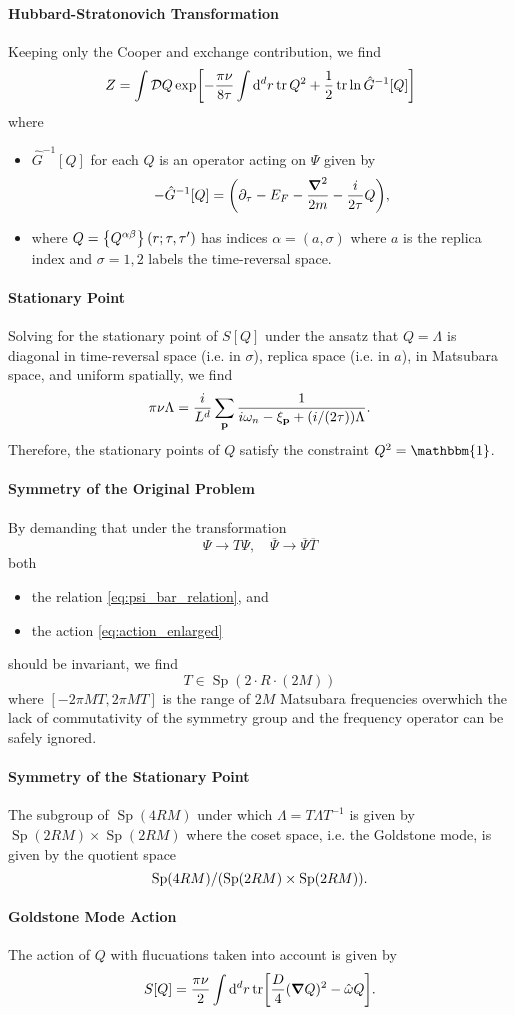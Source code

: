 \documentclass{article}
\begin{document}
\paragraph*{Hubbard-Stratonovich Transformation}
Keeping only the Cooper and exchange contribution, we find
\[ Z = \int \mathcal{D}{Q} \exp[-\frac{\pi \nu}{8\tau} \int \dd[d]{r} \tr Q^2 + \frac{1}{2} \tr \ln \hat{G}^{-1}[Q]] \]
where
\begin{itemize}
    \item $\hat{G}^{-1}[Q]$ for each $Q$ is an operator acting on $\Psi$ given by
    \[ -\hat{G}^{-1}[Q] = \qty(\partial_\tau - E_F - \frac{\grad^2}{2m} -\frac{i}{2\tau}Q), \]
    \item where $Q = \qty{Q^{\alpha\beta}}(r;\tau,\tau')$ has indices $\alpha = (a,\sigma)$ where $a$ is the replica index and $\sigma = 1,2$ labels the time-reversal space.
\end{itemize}

\paragraph*{Stationary Point}
Solving for the stationary point of $S[Q]$ under the ansatz that $Q=\Lambda$ is diagonal in time-reversal space (i.e. in $\sigma$), replica space (i.e. in $a$), in Matsubara space, and uniform spatially, we find
\[ \pi \nu \Lambda = \frac{i}{L^d} \sum_{\vb{p}} \frac{1}{i\omega_n - \xi_{\vb{p}} + (i/(2\tau))\Lambda}. \]
Therefore, the stationary points of $Q$ satisfy the constraint $Q^2 = \mathbbm{1}$.

\paragraph*{Symmetry of the Original Problem}
By demanding that under the transformation
\[ \Psi \rightarrow T\Psi,\quad \overline{\Psi}\rightarrow \overline{\Psi}\overline{T} \]
both
\begin{itemize}
    \item the relation \eqref{eq:psi_bar_relation}, and
    \item the action \eqref{eq:action_enlarged}
\end{itemize}
should be invariant, we find
\[ T \in \operatorname{Sp}(2\cdot R\cdot (2M)) \]
where $[-2\pi MT, 2\pi MT]$ is the range of $2M$ Matsubara frequencies overwhich the lack of commutativity of the symmetry group and the frequency operator can be safely ignored.

\paragraph*{Symmetry of the Stationary Point}
The subgroup of $\operatorname{Sp}(4RM)$ under which $\Lambda = T\Lambda T^{-1}$ is given by $\operatorname{Sp}(2RM) \times \operatorname{Sp}(2RM)$ where the coset space, i.e. the Goldstone mode, is given by the quotient space
\[ \operatorname{Sp}(4RM)/\qty(\operatorname{Sp}(2RM) \times \operatorname{Sp}(2RM)). \]

\paragraph*{Goldstone Mode Action}
The action of $Q$ with flucuations taken into account is given by
\[ S[Q] = \frac{\pi\nu}{2} \int \dd[d]{r} \tr[\frac{D}{4} (\grad Q)^2 - \hat{\omega}Q]. \]


% 
% 
\end{document}
